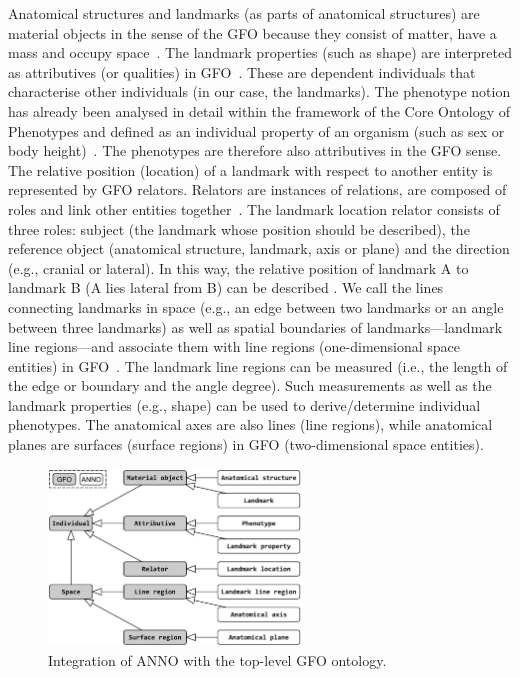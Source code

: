 \documentclass[sw]{iosart2x}
\begin{document}
Anatomical structures and landmarks (as parts of anatomical structures) are material objects in the sense of the GFO because they consist of matter, have a mass and occupy space~\citep{gfospace}.
The landmark properties (such as shape) are interpreted as attributives (or qualities) in GFO~\citep{gfoarchitecture}.
These are dependent individuals that characterise other individuals (in our case, the landmarks).
The phenotype notion has already been analysed in detail within the framework of the Core Ontology of Phenotypes and defined as an individual property of an organism (such as sex or body height)~\citep{ontologicalrepresentation}.
The phenotypes are therefore also attributives in the GFO sense.
The relative position (location) of a landmark with respect to another entity is represented by GFO relators.
Relators are instances of relations, are composed of roles and link other entities together~\citep{gfocategory}.
The landmark location relator consists of three roles: subject (the landmark whose position should be described), the reference object (anatomical structure, landmark, axis or plane) and the direction (e.g., cranial or lateral).
In this way, the relative position of landmark A to landmark B (A lies lateral from B) can be described .
We call the lines connecting landmarks in space (e.g., an edge between two landmarks or an angle between three landmarks) as well as spatial boundaries of
landmarks---landmark line regions---and associate them with line regions (one-dimensional space entities) in GFO~\citep{gfospace}.
The landmark line regions can be measured (i.e., the length of the edge or boundary and the angle degree).
Such measurements as well as the landmark properties (e.g., shape) can be used to derive/determine individual phenotypes.
The anatomical axes are also lines (line regions), while anatomical planes are surfaces (surface regions) in GFO (two-dimensional space entities).

\begin{figure}[h]
\includegraphics[width=0.6\textwidth]{img/gfo.pdf}
\caption{Integration of ANNO with the top-level GFO ontology.}\label{fig:gfo}
\end{figure}
\end{document}
